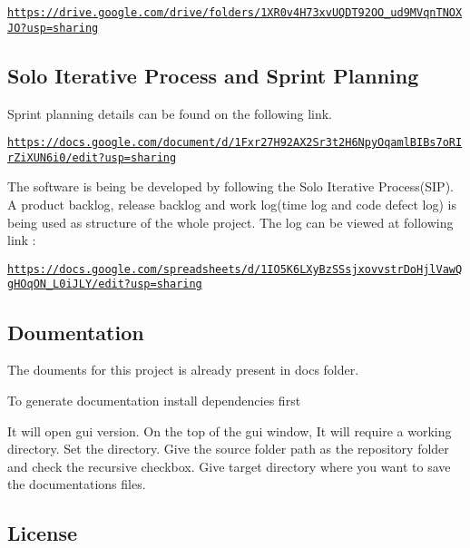 \href{https://drive.google.com/drive/folders/1XR0v4H73xvUQDT92OO_ud9MVqnTNOXJO?usp=sharing}{\tt https\+://drive.\+google.\+com/drive/folders/1\+X\+R0v4\+H73xv\+U\+Q\+D\+T92\+O\+O\+\_\+ud9\+M\+Vqn\+T\+N\+O\+X\+J\+O?usp=sharing}

\subsection*{Solo Iterative Process and Sprint Planning}

Sprint planning details can be found on the following link.

\href{https://docs.google.com/document/d/1Fxr27H92AX2Sr3t2H6NpyOqamlBIBs7oRIrZiXUN6i0/edit?usp=sharing}{\tt https\+://docs.\+google.\+com/document/d/1\+Fxr27\+H92\+A\+X2\+Sr3t2\+H6\+Npy\+Oqaml\+B\+I\+Bs7o\+R\+Ir\+Zi\+X\+U\+N6i0/edit?usp=sharing}

The software is being be developed by following the Solo Iterative Process(\+S\+I\+P). A product backlog, release backlog and work log(time log and code defect log) is being used as structure of the whole project. The log can be viewed at following link \+:

\href{https://docs.google.com/spreadsheets/d/1IO5K6LXyBzSSsjxovvstrDoHjlVawQgHOqON_L0iJLY/edit?usp=sharing}{\tt https\+://docs.\+google.\+com/spreadsheets/d/1\+I\+O5\+K6\+L\+Xy\+Bz\+S\+Ssjxovvstr\+Do\+Hjl\+Vaw\+Qg\+H\+Oq\+O\+N\+\_\+\+L0i\+J\+L\+Y/edit?usp=sharing}

\subsection*{Doumentation}

The douments for this project is already present in docs folder.

To generate documentation install dependencies first


 It will open gui version. On the top of the gui window, It will require a working directory. Set the directory. Give the source folder path as the repository folder and check the recursive checkbox. Give target directory where you want to save the documentations files.

\subsection*{License}


